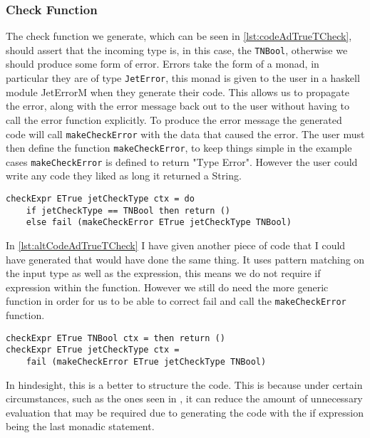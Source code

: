 \subsubsection{Check Function}
The check function we generate, which can be seen in \autoref{lst:codeAdTrueTCheck}, should assert that the incoming type is, in this case, the \texttt{TNBool}, otherwise we should produce some form of error.
Errors take the form of a monad, in particular they are of type \texttt{JetError}, this monad is given to the user in a haskell module JetErrorM when they generate their code.
This allows us to propagate the error, along with the error message back out to the user without having to call the error function explicitly.
To produce the error message the generated code will call \texttt{makeCheckError} with the data that caused the error.
The user must then define the function \texttt{makeCheckError}, to keep things simple in the example cases \texttt{makeCheckError} is defined to return "Type Error".
However the user could write any code they liked as long it returned a String.

\begin{lstlisting}[caption = Code generated for checkExpr from AdTrueT, label=lst:codeAdTrueTCheck]
checkExpr ETrue jetCheckType ctx = do
    if jetCheckType == TNBool then return () 
    else fail (makeCheckError ETrue jetCheckType TNBool)
\end{lstlisting}

In \autoref{lst:altCodeAdTrueTCheck} I have given another piece of code that I could have generated that would have done the same thing.
It uses pattern matching on the input type as well as the expression, this means we do not require if expression within the function.
However we still do need the more generic function in order for us to be able to correct fail and call the \texttt{makeCheckError} function.

\begin{lstlisting}[caption = Alternate Code for checkExpr from AdTrueT, label=lst:altCodeAdTrueTCheck]
checkExpr ETrue TNBool ctx = then return () 
checkExpr ETrue jetCheckType ctx = 
    fail (makeCheckError ETrue jetCheckType TNBool)
\end{lstlisting}

In hindesight, this is a better to structure the code.
This is because under certain circumstances, such as the ones seen in , it can reduce the amount of unnecessary evaluation that may be required due to generating the code with the if expression being the last monadic statement.

